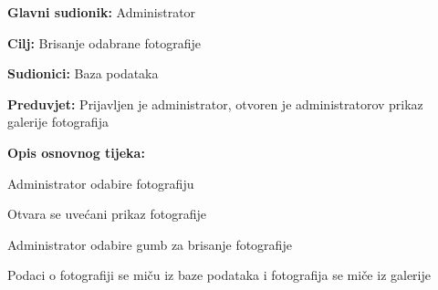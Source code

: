 					\noindent {}
					\begin{packed_item}
						
						\item \textbf{Glavni sudionik: }Administrator
						\item  \textbf{Cilj:} Brisanje odabrane fotografije
						\item  \textbf{Sudionici:} Baza podataka
						\item  \textbf{Preduvjet:} Prijavljen je administrator, otvoren je administratorov prikaz galerije fotografija
						\item  \textbf{Opis osnovnog tijeka:}
						
						\item[] \begin{packed_enum}
							
							\item Administrator odabire fotografiju
							\item Otvara se uvećani prikaz fotografije
							\item Administrator odabire gumb za brisanje fotografije
							\item Podaci o fotografiji se miču iz baze podataka i fotografija se miče iz galerije
							
						\end{packed_enum}
					\end{packed_item}
					
